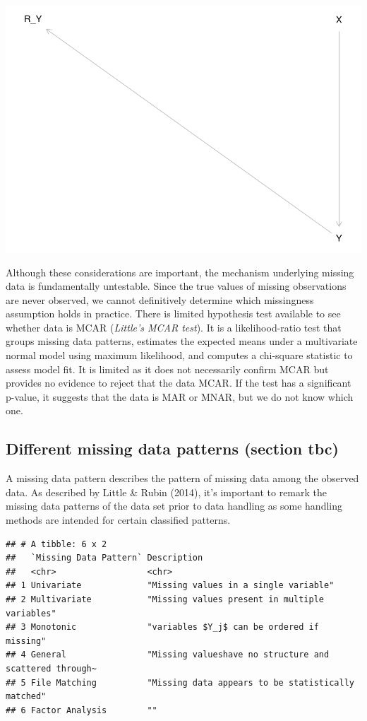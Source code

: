 \documentclass{article}
\newcommand{\pandocbounded}[1]{#1}
\begin{document}
\pandocbounded{\includegraphics[keepaspectratio]{Final_Report_files/figure-latex/unnamed-chunk-3-1.pdf}}

Although these considerations are important, the mechanism underlying
missing data is fundamentally untestable. Since the true values of
missing observations are never observed, we cannot definitively
determine which missingness assumption holds in practice. There is
limited hypothesis test available to see whether data is MCAR
(\emph{Little's MCAR test}). It is a likelihood-ratio test that groups
missing data patterns, estimates the expected means under a multivariate
normal model using maximum likelihood, and computes a chi-square
statistic to assess model fit. It is limited as it does not necessarily
confirm MCAR but provides no evidence to reject that the data MCAR. If
the test has a significant p-value, it suggests that the data is MAR or
MNAR, but we do not know which one.

\subsection{Different missing data patterns (section
tbc)}\label{different-missing-data-patterns-section-tbc}

A missing data pattern describes the pattern of missing data among the
observed data. As described by Little \& Rubin (2014), it's important to
remark the missing data patterns of the data set prior to data handling
as some handling methods are intended for certain classified patterns.

\begin{verbatim}
## # A tibble: 6 x 2
##   `Missing Data Pattern` Description                                            
##   <chr>                  <chr>                                                  
## 1 Univariate             "Missing values in a single variable"                  
## 2 Multivariate           "Missing values present in multiple variables"         
## 3 Monotonic              "variables $Y_j$ can be ordered if missing"            
## 4 General                "Missing valueshave no structure and scattered through~
## 5 File Matching          "Missing data appears to be statistically matched"     
## 6 Factor Analysis        ""
\end{verbatim}
\end{document}
